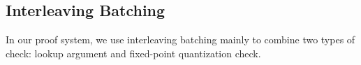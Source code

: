 

\subsection{Interleaving Batching}\label{app:interleaving-batching}

In our proof system, we use interleaving batching mainly to combine
  two types of check:
  lookup argument and fixed-point quantization check.

